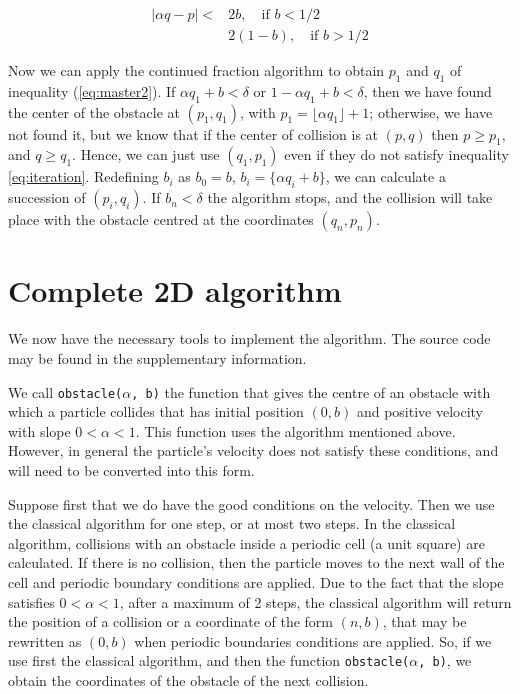 \documentclass{iopart}
\newcommand{\eqref}[1]{(\ref{#1})}
\begin{document}

\begin{eqnarray}
|\alpha  q-p|<  & 2b, \quad \mbox{if } b < 1/2 \\ 
& 2(1-b), \quad  \mbox{if }  b > 1/2 %
\label{eq:master2}
\end{eqnarray}


Now we can apply the continued fraction algorithm to obtain $p_1$ and $q_1$ of inequality \eqref{eq:master2}.  If ${\alpha q_1+b} < \delta$ or $1-{\alpha q_1+b} < \delta$, then we have found the center of the obstacle at $(p_1,q_1)$, with  $p_1=\lfloor \alpha q_1  \rfloor+1$; otherwise, we have not found it, but we know that if the center of collision is at $(p,q)$ then
$p\geq p_1$, and $q \geq q_1$. Hence, we can just use $(q_1,p_1)$ even if they do not satisfy inequality \ref{eq:iteration}. Redefining $b_i$ as $b_0=b$, $b_i=\{\alpha q_i+b\}$, we can calculate a succession of $(p_i,q_i)$. If $b_n<\delta$ the algorithm stops, and the collision will take place with the obstacle centred at the coordinates $(q_n,p_n)$.


\section{Complete 2D algorithm}

We now have the necessary tools to implement the algorithm. The source code may be found in the supplementary information.

We call \texttt{obstacle($\alpha$, b)} the function that gives the centre of an obstacle with which a particle collides that has initial position $(0,b)$ and positive velocity with slope 
$0 < \alpha <1$. This function uses the algorithm mentioned above. However, in general the particle's velocity does not satisfy these conditions, and will need to be converted into this form.

Suppose first that we do have the good conditions on the velocity. Then we use the classical algorithm for one step, or at most two steps. In the classical algorithm, collisions with an obstacle inside a periodic cell (a unit square) are calculated. If there is no collision, then the particle moves to the next wall of the cell and periodic boundary conditions are applied. Due to  the fact that the slope satisfies $0 < \alpha < 1$, after a maximum of 2 steps, the classical algorithm will return the position of a collision or a coordinate of the form $(n,b)$, that may be rewritten as $(0,b)$ when periodic boundaries conditions are applied. So, if we use first the classical algorithm, and then the function \texttt{obstacle($\alpha$, b)}, we obtain the coordinates of the obstacle of the next collision.  
\end{document}

